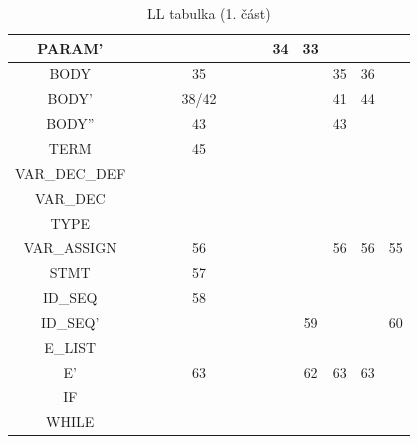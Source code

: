 \documentclass[11pt,a4paper]{article}
\begin{document}
\begin{table}[ht!]
\begin{tabular}{|c|c|c|c|c|c|c|c|c|c|c|c|l|}
        PARAM' &  &  &  &  &  &  &  & 34 & 33 &  &  &  \\ \hline
        BODY &  &  &  & 35 &  &  &  &  &  & 35 & 36 &  \\ \hline
        BODY' &  &  &  & 38/42 &  &  &  &  &  & 41 & 44 &  \\ \hline
        BODY'' &  &  &  & 43 &  &  &  &  &  & 43 &  &  \\ \hline
        TERM &  &  &  & 45 &  &  &  &  &  &  &  &  \\ \hline
        VAR\_DEC\_DEF &  &  &  &  &  &  &  &  &  &  &  &  \\ \hline
        VAR\_DEC &  &  &  &  &  &  &  &  &  &  &  &  \\ \hline
        TYPE &  &  &  &  &  &  &  &  &  &  &  &  \\ \hline
        VAR\_ASSIGN &  &  &  & 56 &  &  &  &  &  & 56 & 56 & 55 \\ \hline
        STMT &  &  &  & 57 &  &  &  &  &  &  &  &  \\ \hline
        ID\_SEQ &  &  &  & 58 &  &  &  &  &  &  &  &  \\ \hline
        ID\_SEQ' &  &  &  &  &  &  &  &  & 59 &  &  & 60 \\ \hline
        E\_LIST &  &  &  &  &  &  &  &  &  &  &  &  \\ \hline
        E' &  &  &  & 63 &  &  &  &  & 62 & 63 & 63 &  \\ \hline
        IF &  &  &  &  &  &  &  &  &  &  &  &  \\ \hline
        WHILE &  &  &  &  &  &  &  &  &  &  &  &  \\ \hline
        \end{tabular}
        \caption{LL tabulka (1. část)}
    \end{table}
\end{document}
